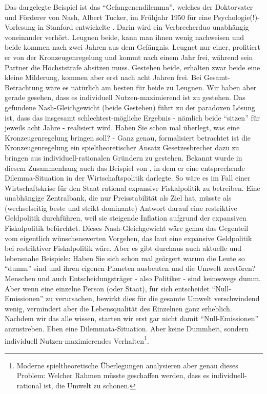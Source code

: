 Das dargelegte Beispiel ist das "`Gefangenendilemma"', welches der Doktorvater und Förderer von Nash, Albert Tucker, im Frühjahr 1950 für eine Psychologie(!)-Vorlesung in Stanford entwickelte \parencite[S. 161]{Nash1994}. Darin wird ein Verbrecherduo unabhängig voneinander verhört. Leugnen beide, kann man ihnen wenig nachweisen und beide kommen nach zwei Jahren aus dem Gefängnis. Leugnet nur einer, profitiert er von der Kronzeugenregelung und kommt nach einem Jahr frei, während sein Partner die Höchststrafe absitzen muss. Gestehen beide, erhalten zwar beide eine kleine Milderung, kommen aber erst nach acht Jahren frei. Bei Gesamt-Betrachtung wäre es natürlich am besten für beide zu Leugnen. Wir haben aber gerade gesehen, dass es individuell Nutzen-maximierend ist zu gestehen. Das gefundene Nash-Gleichgewicht (beide Gestehen) führt zu der paradoxen Lösung ist, dass das insgesamt schlechtest-mögliche Ergebnis - nämlich beide "`sitzen"' für jeweils acht Jahre - realisiert wird. Haben Sie schon mal überlegt, was eine Kronzeugenregelung bringen soll? - Ganz genau, formalisiert betrachtet ist die Kronzeugenregelung ein spieltheoretischer Ansatz Gesetzesbrecher dazu zu bringen aus individuell-rationalen Gründern zu gestehen. Bekannt wurde in diesem Zusammenhang auch das Beispiel von \textcite{Blinder1982}, in dem er eine entsprechende Dilemma-Situation in der Wirtschaftspolitik darlegte. So wäre es im Fall einer Wirtschaftskrise für den Staat rational expansive Fiskalpolitik zu betreiben. Eine unabhängige Zentralbank, die nur Preisstabilität als Ziel hat, müsste als (wechselseitig beste und strikt dominante) Antwort darauf eine restriktive Geldpolitik durchführen, weil sie steigende Inflation aufgrund der expansiven Fiskalpolitik befürchtet. Dieses Nash-Gleichgewicht wäre genau das Gegenteil vom eigentlich wünschenswerten Vorgehen, das laut \textcite{Blinder1982} eine expansive Geldpolitik bei restriktiver Fiskalpolitik wäre. Aber es gibt durchaus auch aktuelle und lebensnahe Beispiele: Haben Sie sich schon mal geärgert warum die Leute so "`dumm"' sind und ihren eigenen Planeten ausbeuten und die Umwelt zerstören? Menschen und auch Entscheidungsträger - also Politiker - sind keineswegs dumm. Aber wenn eine einzelne Person (oder Staat), für sich entscheidet "`Null-Emissionen"' zu verursachen, bewirkt dies für die gesamte Umwelt verschwindend wenig, vermindert aber die Lebensqualität des Einzelnen ganz erheblich. Nachdem wir das alle wissen, starten wir erst gar nicht damit "`Null-Emissionen"' anzustreben. Eben eine Dilemmata-Situation. Aber keine Dummheit, sondern individuell Nutzen-maximierendes Verhalten\footnote{Moderne spieltheoretische Überlegungen analysieren aber genau dieses Problem: Welcher Rahmen müsste geschaffen werden, dass es individuell-rational ist, die Umwelt zu schonen.}.

